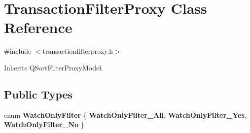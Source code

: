 \hypertarget{class_transaction_filter_proxy}{}\section{Transaction\+Filter\+Proxy Class Reference}
\label{class_transaction_filter_proxy}


{\ttfamily \#include $<$transactionfilterproxy.\+h$>$}



Inherits Q\+Sort\+Filter\+Proxy\+Model.

\subsection*{Public Types}
\begin{DoxyCompactItemize}
\item 
\mbox{\label{class_transaction_filter_proxy_ab41d9f1ee436dd8f037eeca709c2b472}} 
enum {\bfseries Watch\+Only\+Filter} \{ {\bfseries Watch\+Only\+Filter\+\_\+\+All}, 
{\bfseries Watch\+Only\+Filter\+\_\+\+Yes}, 
{\bfseries Watch\+Only\+Filter\+\_\+\+No}
 \}
\end{DoxyCompactItemize}
